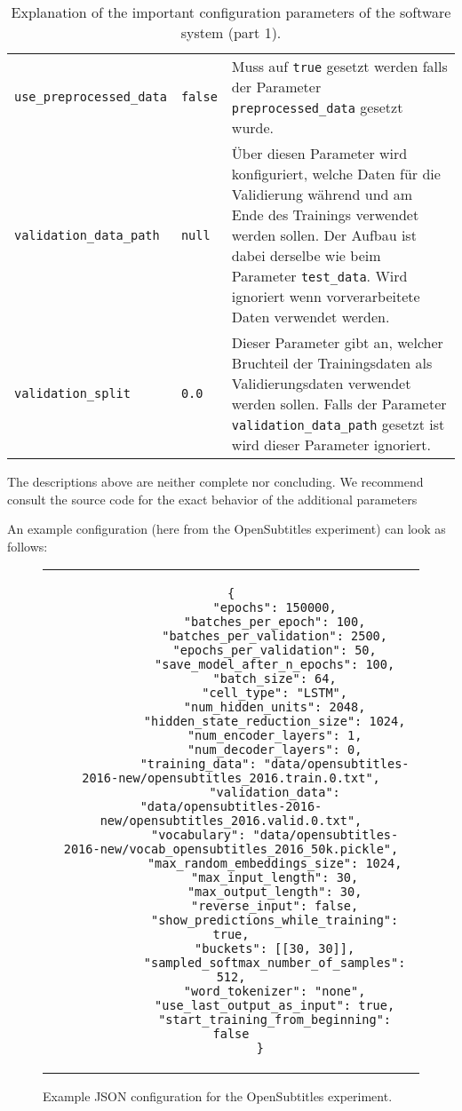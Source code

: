 \begin{table}[H]
\begin{adjustbox}{max width=\textwidth, max height=\textheight}
\begin{tabular}{llp{10cm}}
			\texttt{use{\_}preprocessed{\_}data} & \texttt{false} & Muss auf \texttt{true} gesetzt werden falls der Parameter \texttt{preprocessed{\_}data} gesetzt wurde.\\
			\texttt{validation{\_}data{\_}path} & \texttt{null} & Über diesen Parameter wird konfiguriert, welche Daten für die Validierung während und am Ende des Trainings verwendet werden sollen. Der Aufbau ist dabei derselbe wie beim Parameter \texttt{test{\_}data}. Wird ignoriert wenn vorverarbeitete Daten verwendet werden.\\
			\texttt{validation{\_}split} & \texttt{0.0} & Dieser Parameter gibt an, welcher Bruchteil der Trainingsdaten als Validierungsdaten verwendet werden sollen. Falls der Parameter \texttt{validation{\_}data{\_}path} gesetzt ist wird dieser Parameter ignoriert.\\
			\bottomrule
		\end{tabular}
	\end{adjustbox}
	\caption{Explanation of the important configuration parameters of the software system (part 1).}
\end{table}

The descriptions above are neither complete nor concluding. We recommend consult the source code for the exact behavior of the additional parameters

\clearpage

An example configuration (here from the OpenSubtitles experiment) can look as follows:

\begin{figure}[thp]
	\centering
	\begin{tabular}{c}  %
		\begin{lstlisting}[style=json]
		{
			"epochs": 150000,
			"batches_per_epoch": 100,
			"batches_per_validation": 2500,
			"epochs_per_validation": 50,
			"save_model_after_n_epochs": 100,
			"batch_size": 64,
			"cell_type": "LSTM",
			"num_hidden_units": 2048,
			"hidden_state_reduction_size": 1024,
			"num_encoder_layers": 1,
			"num_decoder_layers": 0,
			"training_data": "data/opensubtitles-2016-new/opensubtitles_2016.train.0.txt",
			"validation_data": "data/opensubtitles-2016-new/opensubtitles_2016.valid.0.txt",
			"vocabulary": "data/opensubtitles-2016-new/vocab_opensubtitles_2016_50k.pickle",
			"max_random_embeddings_size": 1024,
			"max_input_length": 30,
			"max_output_length": 30,
			"reverse_input": false,
			"show_predictions_while_training": true,
			"buckets": [[30, 30]],
			"sampled_softmax_number_of_samples": 512,
			"word_tokenizer": "none",
			"use_last_output_as_input": true,
			"start_training_from_beginning": false
		}
		\end{lstlisting}
	\end{tabular}
	\label{software_usage:config_json_example}
	\caption{Example JSON configuration for the OpenSubtitles experiment.}
\end{figure}


